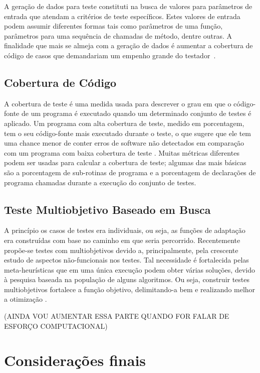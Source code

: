 A geração de dados para teste constituti na busca de valores para parâmetros de entrada que atendam a critérios de teste específicos. Estes valores de entrada podem assumir diferentes formas tais como parâmetros de uma função, parâmetros para uma sequência de chamadas de método, dentre outras. A finalidade que mais se almeja com a geração de dados é aumentar a cobertura de código de casos que demandariam um empenho grande do testador~\cite{huo2017genetic}.

\subsection{Cobertura de Código}

A cobertura de teste é uma medida usada para descrever o grau em que o código-fonte de um programa é executado quando um determinado conjunto de testes é aplicado. Um programa com alta cobertura de teste, medido em porcentagem, tem o seu código-fonte mais executado durante o teste, o que sugere que ele tem uma chance menor de conter erros de software não detectados em comparação com um programa com baixa cobertura de teste \cite{yang2009survey}. Muitas métricas diferentes podem ser usadas para calcular a cobertura de teste; algumas das mais básicas são a porcentagem de sub-rotinas de programa e a porcentagem de declarações de programa chamadas durante a execução do conjunto de testes.

\subsection{Teste Multiobjetivo Baseado em Busca}

A princípio os casos de testes era individuais, ou seja, as funções de adaptação era construídas com base no caminho em que seria percorrido. Recentemente propõe-se testes com multiobjetivos devido a, principalmente, pela
crescente estudo de aspectos não-funcionais nos testes. Tal necessidade é fortalecida pelas meta-heurísticas que em uma única execução podem obter várias soluções, devido à pesquisa baseada na população de alguns algoritmos. Ou seja, construir testes multiobjetivos fortalece a função objetivo, delimitando-a bem e realizando melhor a otimização \cite{huo2017genetic}. 

(AINDA VOU AUMENTAR ESSA PARTE QUANDO FOR FALAR DE ESFORÇO COMPUTACIONAL)

\section{Considerações finais \label{sec:considFinRefTeor}}



